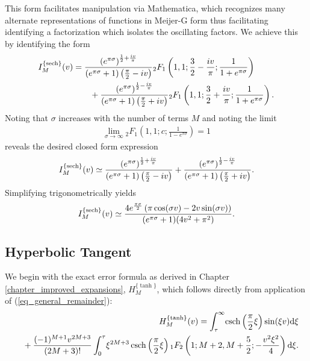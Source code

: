 This form facilitates manipulation via Mathematica, which recognizes many alternate
representations of functions in Meijer-G form thus facilitating identifying a factorization
which isolates the oscillating factors.  We achieve this by identifying the form
\begin{align}
	\begin{split}
	I_M^{\{\operatorname{sech}\}}(v) &=
	\frac{\left(e^{\pi\sigma}\right)^{\frac{1}{2}+\frac{iv}{\pi}}}
	     {\left( e^{\pi\sigma} + 1 \right)\left( \frac{\pi}{2} - iv \right)}
	{}_2F_{1}\left(1, 1; \frac{3}{2} - \frac{iv}{\pi}; \frac{1}{1 + e^{\pi\sigma}} \right)
	\\
	&\quad\quad + \frac{\left(e^{\pi\sigma}\right)^{\frac{1}{2}-\frac{iv}{\pi}}}
	{\left( e^{\pi\sigma} + 1 \right)\left( \frac{\pi}{2} + iv \right)}
	{}_2F_{1}\left(1, 1; \frac{3}{2} + \frac{iv}{\pi}; \frac{1}{1 + e^{\pi\sigma}} \right).
	\end{split}
\end{align}
Noting that $\sigma$ increases with the number of terms $M$ and noting the limit
\begin{align}
	\lim_{\sigma \to \infty} {}_{2}F_{1}\left(1, 1; c; \frac{1}{1-e^{\pi \sigma}}\right) = 1
\end{align}
reveals the desired closed form expression
\begin{align}
	I_M^{\{\operatorname{sech}\}}(v) \simeq
	\frac{\left(e^{\pi\sigma}\right)^{\frac{1}{2}+\frac{iv}{\pi}}}
	{\left( e^{\pi\sigma} + 1 \right)\left( \frac{\pi}{2} - iv \right)}
	+ \frac{\left(e^{\pi\sigma}\right)^{\frac{1}{2}-\frac{iv}{\pi}}}
	{\left( e^{\pi\sigma} + 1 \right)\left( \frac{\pi}{2} + iv \right)}.
\end{align}
Simplifying trigonometrically yields
\begin{align}
	I_M^{\{\operatorname{sech}\}}(v) \simeq
	\frac{
		4 e^{\frac{\pi \sigma}{2}}
		\left(\pi \cos(\sigma v) - 2 v \sin(\sigma v)\right)
	}{(e^{\pi \sigma} + 1)(4v^2 + \pi^2)}.
\end{align}

\subsection{Hyperbolic Tangent}
We begin with the exact error formula as derived in Chapter \ref{chapter_improved_expansions}, $H_M^{\{\tanh\}}$, which follows directly from application of
(\ref{eq_general_remainder}):
\begin{align}
	\begin{split}
		&H_M^{\{\tanh\}}(v) = \int_\tau^{\infty} \!
		\operatorname{csch}\left(\frac{\pi}{2}\xi\right)
		\sin(\xi v) \mathrm{d}\xi
	\end{split}
	\\
	\begin{split}
		& \quad\quad + \frac{(-1)^{M+1}v^{2M+3}}{(2M+3)!} \int_0^{\tau} \!
		\xi^{2M+3} \operatorname{csch}\left(\frac{\pi}{2}\xi\right)
		{}_{1}F_{2}\left(1; M+2, M+\frac{5}{2}; -\frac{v^2 \xi^2}{4}\right) \mathrm{d}\xi.
	\end{split}
\end{align}

